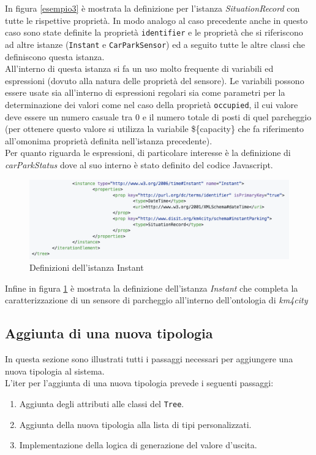 \documentclass[12pt,a4paper,italian]{article}
\begin{document}
In figura \ref{esempio3} è mostrata la definizione per l'istanza \emph{SituationRecord} con tutte le rispettive proprietà. In modo analogo al caso precedente anche in questo caso sono state definite la proprietà \texttt{identifier} e le proprietà che si riferiscono ad altre istanze (\texttt{Instant} e \texttt{CarParkSensor}) ed a seguito tutte le altre classi che definiscono questa istanza.\\
All'interno di questa istanza si fa un uso molto frequente di variabili ed espressioni (dovuto alla natura delle proprietà del sensore). Le variabili possono essere usate sia all'interno di espressioni regolari sia come parametri per la determinazione dei valori come nel caso della proprietà \texttt{occupied}, il cui valore deve essere un numero casuale tra 0 e il numero totale di posti di quel parcheggio (per ottenere questo valore si utilizza la variabile \$\{capacity\} che fa riferimento all'omonima proprietà definita nell'istanza precedente). \\
Per quanto riguarda le espressioni, di particolare interesse è la definizione di \emph{carParkStatus} dove al suo interno è stato definito del codice Javascript.\\
\begin{figure}[h!]
	\centering
	\includegraphics[width=14cm]{img/esempio_p4.png}
	\caption{Definizioni dell'istanza Instant}\label{esempio4}
\end{figure}

Infine in figura \ref{esempio4} è mostrata la definizione dell'istanza \emph{Instant} che completa la caratterizzazione di un sensore di parcheggio all'interno dell'ontologia di \emph{km4city}
\newpage
\subsection{Aggiunta di una nuova tipologia}
In questa sezione sono illustrati tutti i passaggi necessari per aggiungere una nuova tipologia al sistema.\\
L'iter per l'aggiunta di una nuova tipologia prevede i seguenti passaggi:
 \begin{enumerate}
 	\item Aggiunta degli attributi alle classi del \texttt{Tree}.
 	\item Aggiunta della nuova tipologia alla lista di tipi personalizzati.
 	\item Implementazione della logica di generazione del valore d'uscita.
 \end{enumerate}
\end{document}
